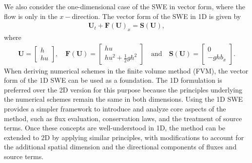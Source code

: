 We also consider the one-dimensional case of the SWE in vector form, where the flow is only in the $x-$direction.
The vector form of the SWE in 1D is given by
\begin{align}\label{eq:vector_form_1D}
    \mathbf{U}_t + \mathbf{F(U)}_x = \mathbf{S(U)},
\end{align}
where
\begin{align}\label{eq:vector_form_1D_variables}
    \mathbf{U} = \begin{bmatrix}
        h \\
        hu
    \end{bmatrix},
    \quad
    \mathbf{F(U)} = \begin{bmatrix}
        hu \\
        hu^2 + \frac{1}{2}gh^2
    \end{bmatrix}
    \quad
    \text{and} \quad
    \mathbf{S(U)} = \begin{bmatrix}
        0 \\
        -gh b_x
    \end{bmatrix}.
\end{align}
When deriving numerical schemes in the finite volume method (FVM), the vector form of the 1D SWE can be used as a foundation.
The 1D formulation is preferred over the 2D version for this purpose because the principles underlying the numerical schemes remain the same in both dimensions.
Using the 1D SWE provides a simpler framework to introduce and analyze core aspects of the method, such as flux evaluation, conservation laws, and the treatment of source terms.
Once these concepts are well-understood in 1D, the method can be extended to 2D by applying similar principles, with modifications to account for the additional spatial dimension and the directional components of fluxes and source terms.


